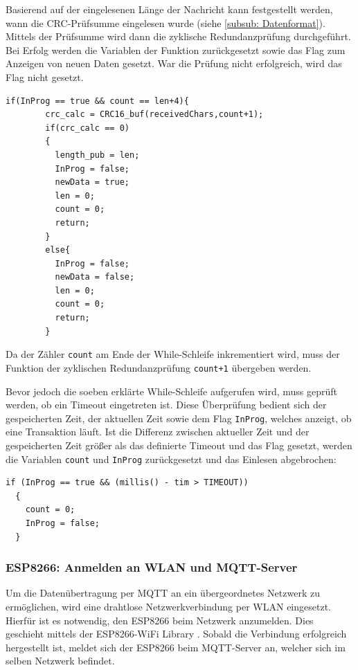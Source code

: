 \smallskip

Basierend auf der eingelesenen Länge der Nachricht kann festgestellt werden, wann die CRC-Prüfsumme eingelesen wurde (siehe \ref{subsub: Datenformat}). Mittels der Prüfsumme
wird dann die zyklische Redundanzprüfung durchgeführt. Bei Erfolg werden die Variablen der Funktion zurückgesetzt sowie das Flag zum Anzeigen von neuen Daten gesetzt. War die Prüfung
nicht erfolgreich, wird das Flag nicht gesetzt.

\begin{lstlisting}[caption={\textit{Zyklische Redundanzprüfung}}]
  if(InProg == true && count == len+4){
        crc_calc = CRC16_buf(receivedChars,count+1); 
        if(crc_calc == 0)
        {
          length_pub = len;
          InProg = false; 
          newData = true; 
          len = 0;        
          count = 0;      
          return;
        }
        else{
          InProg = false;  
          newData = false; 
          len = 0;         
          count = 0;        
          return;         
        }
\end{lstlisting}

Da der Zähler \lstinline!count! am Ende der While-Schleife inkrementiert wird, muss der Funktion der zyklischen Redundanzprüfung \lstinline!count+1! übergeben werden.

\smallskip

Bevor jedoch die soeben erklärte While-Schleife aufgerufen wird, muss geprüft werden, ob ein Timeout eingetreten ist. Diese Überprüfung bedient sich der gespeicherten Zeit,
der aktuellen Zeit sowie dem Flag \lstinline!InProg!, welches anzeigt, ob eine Transaktion läuft. Ist die Differenz zwischen aktueller Zeit und der gespeicherten Zeit
größer als das definierte Timeout und das Flag gesetzt, werden die Variablen \lstinline!count! und \lstinline!InProg! zurückgesetzt und das Einlesen abgebrochen:

\begin{lstlisting}[caption={\textit{Abbruch durch Timeout}}]
  if (InProg == true && (millis() - tim > TIMEOUT))
  {
    count = 0;
    InProg = false;
  }
\end{lstlisting}

\subsubsection{ESP8266: Anmelden an WLAN und MQTT-Server}
\label{subsub: AnmeldenMQTT}

Um die Datenübertragung per \ac{MQTT} an ein übergeordnetes Netzwerk zu ermöglichen, wird eine drahtlose Netzwerkverbindung per \acs{WLAN}
eingesetzt. Hierfür ist es notwendig, den ESP8266 beim Netzwerk anzumelden. Dies geschieht mittels der ESP8266-WiFi Library \citep{ESPWiFi}.
Sobald die Verbindung erfolgreich hergestellt ist, meldet sich der ESP8266 beim \ac{MQTT}-Server an, welcher sich im selben Netzwerk befindet.

